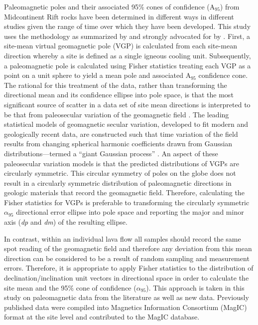 \documentclass[11pt,letterpaper]{article}
\begin{document}
Paleomagnetic poles and their associated 95$\%$ cones of confidence (A$_{95}$) from Midcontinent Rift rocks have been determined in different ways in different studies given the range of time over which they have been developed. This study uses the methodology as summarized by \cite{Butler1992a} and strongly advocated for by \citet{Deenen2011a}. First, a site-mean virtual geomagnetic pole (VGP) is calculated from each site-mean direction whereby a site is defined as a single igneous cooling unit. Subsequently, a paleomagnetic pole is calculated using Fisher statistics treating each VGP as a point on a unit sphere to yield a mean pole and associated A$_{95}$ confidence cone. The rational for this treatment of the data, rather than transforming the directional mean and its confidence ellipse into pole space, is that the most significant source of scatter in a data set of site mean directions is interpreted to be that from paleosecular variation of the geomagnetic field \citep{Deenen2011a}. The leading statistical models of geomagnetic secular variation, developed to fit modern and geologically recent data, are constructed such that time variation of the field results from changing spherical harmonic coefficients drawn from Gaussian distributions---termed a ``giant Gaussian process'' \cite[e.g.,][]{Constable1988a, Tauxe2004a}. An aspect of these paleosecular variation models is that the predicted distributions of VGPs are circularly symmetric. This circular symmetry of poles on the globe does not result in a circularly symmetric distribution of paleomagnetic directions in geologic materials that record the geomagnetic field. Therefore, calculating the Fisher statistics for VGPs is preferable to transforming the circularly symmetric $\alpha_{95}$ directional error ellipse into pole space and reporting the major and minor axis (\textit{dp} and \textit{dm}) of the resulting ellipse.

In contrast, within an individual lava flow all samples should record the same spot reading of the geomagnetic field and therefore any deviation from this mean direction can be considered to be a result of random sampling and measurement errors. Therefore, it is appropriate to apply Fisher statistics to the distribution of declination/inclination unit vectors in directional space in order to calculate the site mean and the 95$\%$ cone of confidence ($\alpha_{95}$). This approach is taken in this study  on paleomagnetic data from the literature as well as new data. Previously published data were compiled into Magnetics Information Consortium (MagIC) format at the site level and contributed to the MagIC database.
\end{document}
